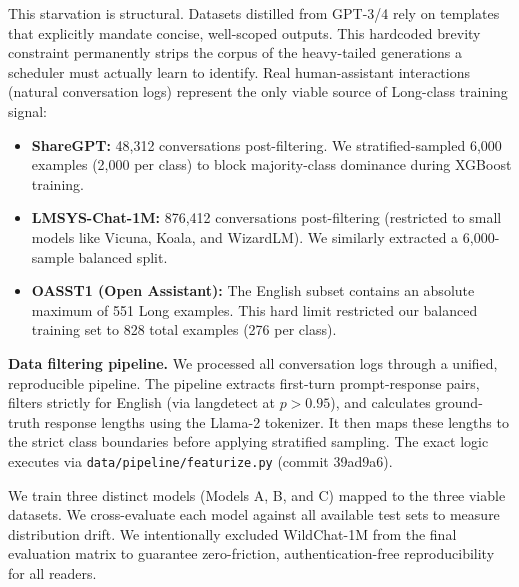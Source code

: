 \documentclass[10pt]{article}
\begin{document}
This starvation is structural. Datasets distilled from GPT-3/4 rely on templates that explicitly mandate concise, well-scoped outputs. This hardcoded brevity constraint permanently strips the corpus of the heavy-tailed generations a scheduler must actually learn to identify. Real human-assistant interactions (natural conversation logs) represent the only viable source of Long-class training signal:

\begin{itemize}
\item \textbf{ShareGPT:} 48,312 conversations post-filtering. We stratified-sampled 6,000 examples (2,000 per class) to block majority-class dominance during XGBoost training.
\item \textbf{LMSYS-Chat-1M:} 876,412 conversations post-filtering (restricted to small models like Vicuna, Koala, and WizardLM). We similarly extracted a 6,000-sample balanced split.
\item \textbf{OASST1 (Open Assistant):} The English subset contains an absolute maximum of 551 Long examples. This hard limit restricted our balanced training set to 828 total examples (276 per class).
\end{itemize}

\textbf{Data filtering pipeline.} We processed all conversation logs through a unified, reproducible pipeline. The pipeline extracts first-turn prompt-response pairs, filters strictly for English (via langdetect at $p>0.95$), and calculates ground-truth response lengths using the Llama-2 tokenizer. It then maps these lengths to the strict class boundaries before applying stratified sampling. The exact logic executes via \texttt{data/pipeline/featurize.py} (commit 39ad9a6).

We train three distinct models (Models A, B, and C) mapped to the three viable datasets. We cross-evaluate each model against all available test sets to measure distribution drift. We intentionally excluded WildChat-1M from the final evaluation matrix to guarantee zero-friction, authentication-free reproducibility for all readers.
\end{document}
